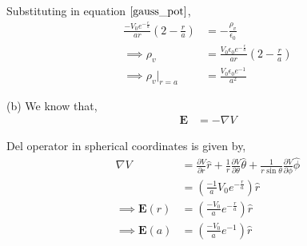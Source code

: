 \documentclass[12pt]{article}
\providecommand{\brak}[1]{\ensuremath{\left(#1\right)}}
\begin{document}
Substituting in equation $\ref{gauss_pot}$,
\begin{align*}
    \frac{-V_0 e^{-\frac{r}{a}}}{ar} \brak{2 - \frac{r}{a}} &= -\frac{\rho_v}{\epsilon_0}\\
    \implies \rho_v &= \frac{V_0 \epsilon_0 e^{-\frac{r}{a}}}{ar} \brak{2 - \frac{r}{a}}\\
    \implies \rho_v \Biggr|_{r = a} &= \frac{V_0 \epsilon_0 e^{-1}}{a^2}
\end{align*}

(b) We know that,
\begin{align*}
    \mathbf{E} &= -\nabla V
\end{align*}

Del operator in spherical coordinates is given by,
\begin{align*}
    \nabla V &= \frac{\partial V}{\partial r} \hat{r} + \frac{1}{r} \frac{\partial V}{\partial \theta} \hat{\theta} + \frac{1}{r \sin \theta} \frac{\partial V}{\partial \phi} \hat{\phi}\\
    &= \brak{\frac{-1}{a} V_0 e^{-\frac{r}{a}}} \hat{r}\\
    \implies \mathbf{E}\brak{r} &= \brak{\frac{-V_0}{a} e^{-\frac{r}{a}}} \hat{r}\\
    \implies \mathbf{E}\brak{a} &= \brak{\frac{-V_0}{a} e^{-1}} \hat{r}
\end{align*}
\end{document}
